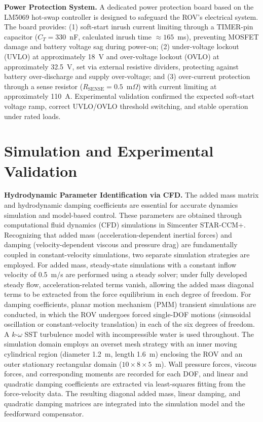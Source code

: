 \begin{digest}
\textbf{Power Protection System.} A dedicated power protection board based on the LM5069 hot-swap controller is designed to safeguard the ROV's electrical system. The board provides: (1) soft-start inrush current limiting through a TIMER-pin capacitor ($C_T = 330$~nF, calculated inrush time $\approx 165$~ms), preventing MOSFET damage and battery voltage sag during power-on; (2) under-voltage lockout (UVLO) at approximately 18~V and over-voltage lockout (OVLO) at approximately 32.5~V, set via external resistive dividers, protecting against battery over-discharge and supply over-voltage; and (3) over-current protection through a sense resistor ($R_{\text{SENSE}} = 0.5$~m$\Omega$) with current limiting at approximately 110~A. Experimental validation confirmed the expected soft-start voltage ramp, correct UVLO/OVLO threshold switching, and stable operation under rated loads.

\section{Simulation and Experimental Validation}

\textbf{Hydrodynamic Parameter Identification via CFD.} The added mass matrix and hydrodynamic damping coefficients are essential for accurate dynamics simulation and model-based control. These parameters are obtained through computational fluid dynamics (CFD) simulations in Simcenter STAR-CCM+. Recognizing that added mass (acceleration-dependent inertial forces) and damping (velocity-dependent viscous and pressure drag) are fundamentally coupled in constant-velocity simulations, two separate simulation strategies are employed. For added mass, steady-state simulations with a constant inflow velocity of 0.5~m/s are performed using a steady solver; under fully developed steady flow, acceleration-related terms vanish, allowing the added mass diagonal terms to be extracted from the force equilibrium in each degree of freedom. For damping coefficients, planar motion mechanism (PMM) transient simulations are conducted, in which the ROV undergoes forced single-DOF motions (sinusoidal oscillation or constant-velocity translation) in each of the six degrees of freedom. A $k$-$\omega$ SST turbulence model with incompressible water is used throughout. The simulation domain employs an overset mesh strategy with an inner moving cylindrical region (diameter 1.2~m, length 1.6~m) enclosing the ROV and an outer stationary rectangular domain ($10 \times 8 \times 5$~m). Wall pressure forces, viscous forces, and corresponding moments are recorded for each DOF, and linear and quadratic damping coefficients are extracted via least-squares fitting from the force-velocity data. The resulting diagonal added mass, linear damping, and quadratic damping matrices are integrated into the simulation model and the feedforward compensator.


\end{digest}
